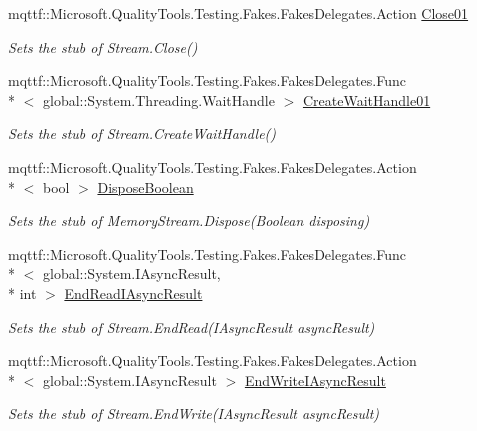 \begin{DoxyCompactItemize}
mqttf\-::\-Microsoft.\-Quality\-Tools.\-Testing.\-Fakes.\-Fakes\-Delegates.\-Action \hyperlink{class_system_1_1_i_o_1_1_fakes_1_1_stub_memory_stream_a02c7e809d8a389eecffeb6ce89fb7511}{Close01}
\begin{DoxyCompactList}\small\item\em Sets the stub of Stream.\-Close()\end{DoxyCompactList}\item 
mqttf\-::\-Microsoft.\-Quality\-Tools.\-Testing.\-Fakes.\-Fakes\-Delegates.\-Func\\*
$<$ global\-::\-System.\-Threading.\-Wait\-Handle $>$ \hyperlink{class_system_1_1_i_o_1_1_fakes_1_1_stub_memory_stream_a3215faac1e5904fe30cb105336a4fbd3}{Create\-Wait\-Handle01}
\begin{DoxyCompactList}\small\item\em Sets the stub of Stream.\-Create\-Wait\-Handle()\end{DoxyCompactList}\item 
mqttf\-::\-Microsoft.\-Quality\-Tools.\-Testing.\-Fakes.\-Fakes\-Delegates.\-Action\\*
$<$ bool $>$ \hyperlink{class_system_1_1_i_o_1_1_fakes_1_1_stub_memory_stream_a2cd004aa8c77d04474b973e54004d123}{Dispose\-Boolean}
\begin{DoxyCompactList}\small\item\em Sets the stub of Memory\-Stream.\-Dispose(\-Boolean disposing)\end{DoxyCompactList}\item 
mqttf\-::\-Microsoft.\-Quality\-Tools.\-Testing.\-Fakes.\-Fakes\-Delegates.\-Func\\*
$<$ global\-::\-System.\-I\-Async\-Result, \\*
int $>$ \hyperlink{class_system_1_1_i_o_1_1_fakes_1_1_stub_memory_stream_a2f52741a1fc8955b0de2eaf198d599b2}{End\-Read\-I\-Async\-Result}
\begin{DoxyCompactList}\small\item\em Sets the stub of Stream.\-End\-Read(\-I\-Async\-Result async\-Result)\end{DoxyCompactList}\item 
mqttf\-::\-Microsoft.\-Quality\-Tools.\-Testing.\-Fakes.\-Fakes\-Delegates.\-Action\\*
$<$ global\-::\-System.\-I\-Async\-Result $>$ \hyperlink{class_system_1_1_i_o_1_1_fakes_1_1_stub_memory_stream_a6275f0b6bdadccd4d37eb73711e09fb7}{End\-Write\-I\-Async\-Result}
\begin{DoxyCompactList}\small\item\em Sets the stub of Stream.\-End\-Write(\-I\-Async\-Result async\-Result)\end{DoxyCompactList}\item 

\end{DoxyCompactItemize}
